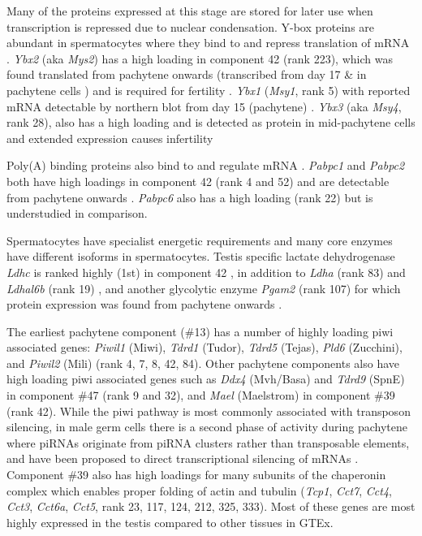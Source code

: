 Many of the proteins expressed at this stage are stored for later use when transcription is repressed due to nuclear condensation.
Y-box proteins are abundant in spermatocytes where they bind to and repress translation of mRNA \parencite[reviewed in][]{Kleene2016Positiondependent}.
\textit{Ybx2} (aka \textit{Mys2}) has a high loading in component 42 (rank 223), which was found translated from pachytene onwards \parencite{Kwon1993Proteins, Oko1996Germ} (transcribed from day 17 \& in pachytene cells \parencite{Gu1998Mammalian}) and is required for fertility \parencite{Yang2005Absence}.
\textit{Ybx1} (\textit{Msy1}, rank 5) with reported mRNA detectable by northern blot from day 15 (pachytene) \parencite{Tafuri1993mouse}.
\textit{Ybx3} (aka \textit{Msy4}, rank 28), also has a high loading and is detected as protein in mid-pachytene cells \parencite{Davies2000SequenceSpecific} and extended expression causes infertility \parencite{Giorgini2002Translational}

Poly(A) binding proteins also bind to and regulate mRNA \parencite[reviewed in][]{Ozturk2018Potential}.
\textit{Pabpc1} and \textit{Pabpc2} both have high loadings in component 42 (rank 4 and 52) and are detectable from pachytene onwards \parencite{C.Kleene1994Developmental, Gu1995Poly, Kleene1998Mouse, Lee2000Expression, Kimura2009Characterization}.
\textit{Pabpc6} also has a high loading (rank 22) but is understudied in comparison.

Spermatocytes have specialist energetic requirements and many core enzymes have different isoforms in spermatocytes.
Testis specific lactate dehydrogenase \textit{Ldhc} is ranked highly (1st) in component 42 \parencite{Goldberg1963Lactic, Blanco1963Lactate, Goldberg2010LDHC}, in addition to \textit{Ldha} (rank 83) and \textit{Ldhal6b} (rank 19) \parencite{Wang2005Cloning}, and another glycolytic enzyme \textit{Pgam2} (rank 107) for which protein expression was found from pachytene onwards \parencite{Fundele1987Developmental}.

The earliest pachytene component (\#13) has a number of highly loading piwi associated genes: \textit{Piwil1} (Miwi), \textit{Tdrd1} (Tudor), \textit{Tdrd5} (Tejas), \textit{Pld6} (Zucchini), and \textit{Piwil2} (Mili) (rank 4, 7, 8, 42, 84).
Other pachytene components also have high loading piwi associated genes such as \textit{Ddx4} (Mvh/Basa) and \textit{Tdrd9} (SpnE) in component \#47 (rank 9 and 32), and \textit{Mael} (Maelstrom) in component \#39 (rank 42).
While the piwi pathway is most commonly associated with transposon silencing, in male germ cells there is a second phase of activity during pachytene where piRNAs originate from piRNA clusters rather than transposable elements, and have been proposed to direct transcriptional silencing of mRNAs \parencite{Gou2014Pachytene, Iwasaki2015PIWIInteracting}.
Component \#39 also has high loadings for many subunits of the chaperonin complex which enables proper folding of actin and tubulin \parencite{Dun2012role} (\textit{Tcp1}, \textit{Cct7}, \textit{Cct4}, \textit{Cct3}, \textit{Cct6a}, \textit{Cct5}, rank 23, 117, 124, 212, 325, 333).
Most of these genes are most highly expressed in the testis compared to other tissues in GTEx.

